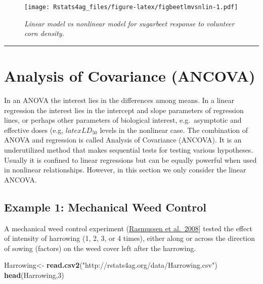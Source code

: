 \documentclass[letterpaper,]{book}
\newenvironment{Shaded}{\begin{snugshade}}{\end{snugshade}}
\newcommand{\DecValTok}[1]{\textcolor[rgb]{0.00,0.00,0.81}{#1}}
\newcommand{\KeywordTok}[1]{\textcolor[rgb]{0.13,0.29,0.53}{\textbf{#1}}}
\newcommand{\NormalTok}[1]{#1}
\newcommand{\StringTok}[1]{\textcolor[rgb]{0.31,0.60,0.02}{#1}}
\begin{document}
\begin{figure}
\centering
\texttt{[image: Rstats4ag\_files/figure-latex/figbeetlmvsnlin-1.pdf]}
\caption{\label{fig:figbeetlmvsnlin}\emph{Linear model vs nonlinear model for sugarbeet response to volunteer corn density.}}
\end{figure}

\begin{center}\rule{0.5\linewidth}{0.5pt}\end{center}

\hypertarget{analysis-of-covariance-ancova}{%
\chapter{Analysis of Covariance (ANCOVA)}\label{analysis-of-covariance-ancova}}

In an ANOVA the interest lies in the differences among means. In a linear regression the interest lies in the intercept and slope parameters of regression lines, or perhaps other parameters of biological interest, e.g.~asymptotic and effective doses (e.g, \(latex LD_{50}\) levels in the nonlinear case. The combination of ANOVA and regression is called Analysis of Covariance (ANCOVA). It is an underutilized method that makes sequential tests for testing various hypotheses. Usually it is confined to linear regressions but can be equally powerful when used in nonlinear relationships. However, in this section we only consider the linear ANCOVA.

\hypertarget{example-1-mechanical-weed-control}{%
\section{Example 1: Mechanical Weed Control}\label{example-1-mechanical-weed-control}}

A mechanical weed control experiment (\href{http://onlinelibrary.wiley.com/doi/10.1111/j.1365-3180.2008.00661.x/full}{Rasmussen et al.~2008}{]} tested the effect of intensity of harrowing (1, 2, 3, or 4 times), either along or across the direction of sowing (factors) on the weed cover left after the harrowing.

\begin{Shaded}
\begin{Highlighting}[]
\NormalTok{Harrowing<-}\StringTok{ }\KeywordTok{read.csv2}\NormalTok{(}\StringTok{"http://rstats4ag.org/data/Harrowing.csv"}\NormalTok{)}
\KeywordTok{head}\NormalTok{(Harrowing,}\DecValTok{3}\NormalTok{)}
\end{Highlighting}
\end{Shaded}
\end{document}
